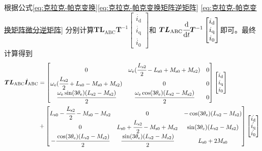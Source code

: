 根据公式\eqref{eq:克拉克-帕克变换}\eqref{eq:克拉克-帕克变换矩阵逆矩阵}
\eqref{eq:克拉克-帕克变换矩阵微分逆矩阵}
分别计算\(\bm{T}\bm{L}_{\mathrm{ABC}}\bm{T}^{-1}
\begin{bmatrix}\dot{i_{\mathrm{d}}}\\\dot{i_{\mathrm{q}}}\\\dot{i_{\mathrm{0}}}\end{bmatrix}\)和
\(\bm{T}\bm{L}_{\mathrm{ABC}}\cfrac{\mathrm{d}}{\mathrm{d} t}\bm{T}^{-1}
\begin{bmatrix}i_{\mathrm{d}}\\i_{\mathrm{q}}\\i_{\mathrm{0}}\end{bmatrix}\)即可。最终计算得到
\begin{align*}
    \bm{T}\bm{L}_{\mathrm{ABC}}\dot{\bm{I}}_{\mathrm{ABC}} & =
    \begin{bmatrix}
        0&\omega_{\mathrm{e}}(\cfrac{L_{\mathrm{s}2}}2-L_{\mathrm{s}0}+M_{\mathrm{s}0}+M_{\mathrm{s}2})&0\\
        \omega_{\mathrm{e}}(\cfrac{L_{\mathrm{s}2}}2+L_{\mathrm{s}0}-M_{\mathrm{s}0}+M_{\mathrm{s}2})&0&0\\
        \cfrac {\omega_{\mathrm{e}}\sin(3\theta_{\mathrm{e}})(L_{\mathrm{s}2}-M_{\mathrm{s}2})}{2}
        &\cfrac {\omega_{\mathrm{e}}\cos(3\theta_{\mathrm{e}})(L_{\mathrm{s}2}-M_{\mathrm{s}2})}{2}&0
    \end{bmatrix}
    \begin{bmatrix}i_{\mathrm{d}}\\i_{\mathrm{q}}\\i_{\mathrm{0}}\end{bmatrix}\\
    &+
    \begin{bmatrix}
        L_{\mathrm{s}0}-\cfrac{L_{\mathrm{s}2}}{2}-M_{\mathrm{s}0}-M_{\mathrm{s}2}&0
        &-\cos(3\theta_{\mathrm{e}})(L_{\mathrm{s}2}-M_{\mathrm{s}2})
        \\0&L_{\mathrm{s}0}+\cfrac{L_{\mathrm{s}2}}{2}-M_{\mathrm{s}0}+M_{\mathrm{s}2}
        &\sin(3\theta_{\mathrm{e}})(L_{\mathrm{s}2}-M_{\mathrm{s}2})\\
        -\cfrac {\cos(3\theta_{\mathrm{e}})(L_{\mathrm{s}2}-M_{\mathrm{s}2})}{2}
        &\cfrac {\sin(3\theta_{\mathrm{e}})(L_{\mathrm{s}2}-M_{\mathrm{s}2})}{2}&L_{\mathrm{s}0}+2M_{\mathrm{s}0}
    \end{bmatrix}
    \begin{bmatrix}\dot{i_{\mathrm{d}}}\\\dot{i_{\mathrm{q}}}\\\dot{i_{\mathrm{0}}}\end{bmatrix}
\end{align*}

